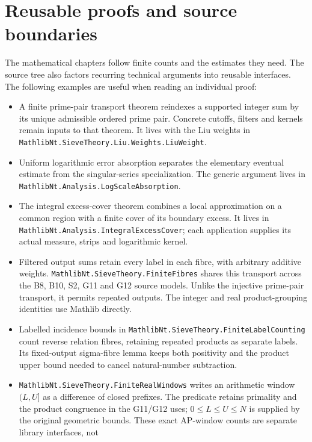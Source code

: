 \section{Reusable proofs and source boundaries}

The mathematical chapters follow finite counts and the estimates they need.
The source tree also factors recurring technical arguments into reusable
interfaces. The following examples are useful when reading an individual proof:
\begin{itemize}
\item A finite prime-pair transport theorem reindexes a supported integer
      sum by its unique admissible ordered prime pair. Concrete cutoffs,
      filters and kernels remain inputs to that theorem. It lives with
      the Liu weights in \texttt{MathlibNt.SieveTheory.Liu.Weights.LiuWeight}.
\item Uniform logarithmic error absorption separates the elementary
      eventual estimate from the singular-series specialization. The
      generic argument lives in \texttt{MathlibNt.Analysis.LogScaleAbsorption}.
\item The integral excess-cover theorem combines a local approximation on
      a common region with a finite cover of its boundary excess. It lives
      in \texttt{MathlibNt.Analysis.IntegralExcessCover}; each application
      supplies its actual measure, strips and logarithmic kernel.
\item Filtered output sums retain every label in each fibre, with arbitrary
      additive weights. \texttt{MathlibNt.SieveTheory.FiniteFibres} shares this
      transport across the B8, B10, S2, G11 and G12 source models. Unlike the
      injective prime-pair transport, it permits repeated outputs. The
      integer and real product-grouping identities use Mathlib directly.
\item Labelled incidence bounds in
      \texttt{MathlibNt.SieveTheory.FiniteLabelCounting} count reverse
      relation fibres, retaining repeated products as separate labels.
      Its fixed-output sigma-fibre lemma keeps both positivity and the
      product upper bound needed to cancel natural-number subtraction.
\item \texttt{MathlibNt.SieveTheory.FiniteRealWindows} writes an arithmetic
      window $(L,U]$ as a difference of closed prefixes. The predicate
      retains primality and the product congruence in the G11/G12 uses;
      $0\le L\le U\le N$ is supplied by the original geometric bounds.
      These exact AP-window counts are separate library interfaces, not

\end{itemize}
